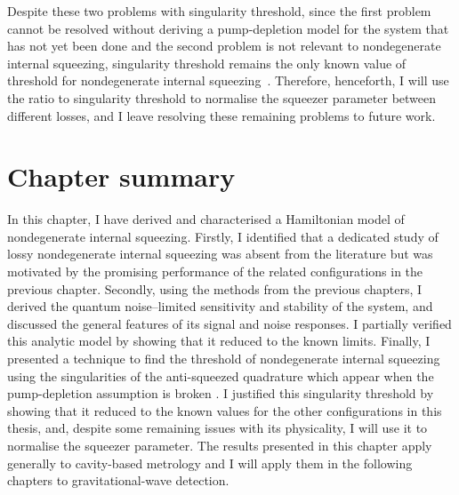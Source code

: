 Despite these two problems with singularity threshold, since the first problem cannot be resolved without deriving a pump-depletion model for the system that has not yet been done  and the second problem is not relevant to nondegenerate internal squeezing, singularity threshold remains the only known value of threshold for nondegenerate internal squeezing~\cite{}. Therefore, henceforth, I will use the ratio to singularity threshold to normalise the squeezer parameter between different losses, and I leave resolving these remaining problems to future work. 


\section{Chapter summary}

In this chapter, I have derived and characterised a Hamiltonian model of nondegenerate internal squeezing. Firstly, I identified that a dedicated study of lossy nondegenerate internal squeezing was absent from the literature but was motivated by the promising performance of the related configurations in the previous chapter. Secondly, using the methods from the previous chapters, I derived the quantum noise--limited sensitivity and stability of the system, and discussed the general features of its signal and noise responses. I partially verified this analytic model by showing that it reduced to the known limits. Finally, I presented a  technique to find the threshold of nondegenerate internal squeezing using the singularities of the anti-squeezed quadrature which appear when the pump-depletion assumption is broken . I justified this singularity threshold by showing that it reduced to the known values for the other configurations in this thesis, and, despite some remaining issues with its physicality, I will use it to normalise the squeezer parameter. 
The results presented in this chapter apply generally to cavity-based metrology and I will apply them in the following chapters to gravitational-wave detection.



